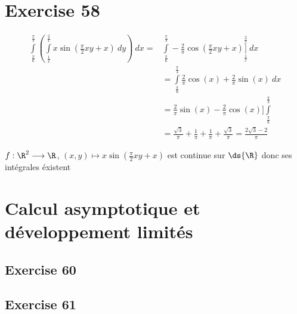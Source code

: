 \documentclass[11pt]{book}
\begin{document}
\newpage
	\section{Exercise 58}

	\begin{figure}[ht!]
		\centering
		\caption{}
	\end{figure}

	\begin{align*}
	\int\limits_{\frac{\pi}{6}}^{\frac{\pi}{3}} \left( \int\limits_{\frac{1}{x}}^{\frac{2}{x}} x \sin(\frac{\pi}{2}xy+x) \  d y  \right)  \  d x =& \int\limits_{\frac{\pi}{6}}^{\frac{\pi}{3}} -\frac{2}{\pi}\cos\left( \frac{\pi}{2}xy+x \right) \Bigg]\limits_{\frac{1}{x}}^{\frac{2}{x}} \  d x \\
	&= \int\limits_{\frac{\pi}{6}}^{\frac{\pi}{3}} \frac{2}{\pi}\cos(x)+\frac{2}{\pi}\sin(x) \  d x\\
	&= \frac{2}{\pi}\sin (x)-\frac{2}{\pi}\cos(x)\Big] \int\limits_{\frac{\pi}{6}}^{\frac{\pi}{3}}\\
	&= \frac{\sqrt{3} }{\pi} + \frac{1}{\pi} + \frac{1}{\pi} +\frac{\sqrt{3} }{\pi} = \frac{2\sqrt{3} -2}{\pi}
	\end{align*}

	$f: \R^2 \longrightarrow \R$, $ (x,y) \longmapsto x \sin\left( \frac{\pi}{2}xy+x \right) $ est continue sur $\ds{\R}$ donc ses intégrales éxistent 

	\section{Calcul asymptotique et développement limités}

	\subsection{Exercise 60}

	

	\subsection{Exercise 61}
\end{document}
